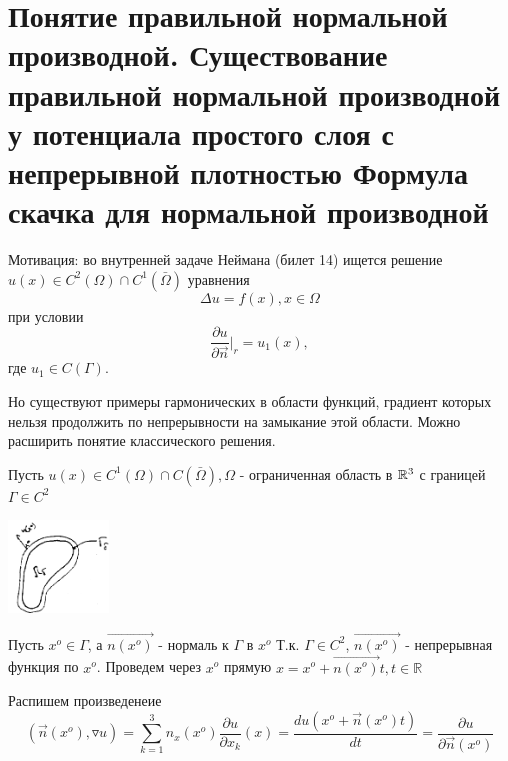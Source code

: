 \section{ Понятие правильной нормальной производной. Существование правильной нормальной производной у потенциала простого слоя с непрерывной плотностью Формула скачка для нормальной производной}
Мотивация: во внутренней задаче Неймана (билет 14) ищется решение $u(x) \in C^2(\Omega) \cap C^1(\bar{\Omega})$ уравнения $$\Delta u = f(x), x \in \Omega$$ при условии $$\frac{\partial u}{\partial \vec{n}}|_r = u_1(x),$$ где $u_1 \in C(\Gamma)$.

Но существуют примеры гармонических в области функций, градиент которых нельзя продолжить по непрерывности на замыкание этой области. Можно расширить понятие классического решения.

Пусть $u(x) \in C^1(\Omega) \cap C(\bar{\Omega}), \Omega$ - ограниченная область в $\mathbb{R}^3$ с границей $\Gamma \in C^2$
\begin{center}
\includegraphics[width=0.2\textwidth]{31_1_new}
\end{center}
Пусть $x^o \in \Gamma$, а $\vec{n(x^o)}$ - нормаль к $\Gamma$ в $x^o$ Т.к. $\Gamma \in C^2$, $\vec{n(x^o)}$ - непрерывная функция по $x^o$. Проведем через $x^o$ прямую $x = x^o + \vec{n(x^o)}t, t \in \mathbb{R}$

Распишем произведенеие $$(\vec{n}(x^o), \triangledown u) = \sum_{k=1}^{3} n_x(x^o)\frac{\partial u}{\partial x_k}(x) = \frac{du(x^o + \vec{n}(x^o)t)}{dt} = \frac{\partial u}{\partial \vec{n}(x^o)}$$


